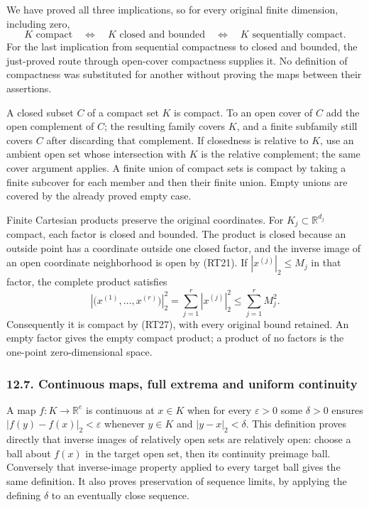 \documentclass[
  11pt,
]{article}
\begin{document}
We have proved all three implications, so for every original finite
dimension, including zero, \[
K\text{ compact}\quad\Longleftrightarrow\quad
K\text{ closed and bounded}
\quad\Longleftrightarrow\quad
K\text{ sequentially compact}.
\tag{RT27}
\] For the last implication from sequential compactness to closed and
bounded, the just-proved route through open-cover compactness supplies
it. No definition of compactness was substituted for another without
proving the maps between their assertions.

A closed subset \(C\) of a compact set \(K\) is compact. To an open
cover of \(C\) add the open complement of \(C\); the resulting family
covers \(K\), and a finite subfamily still covers \(C\) after discarding
that complement. If closedness is relative to \(K\), use an ambient open
set whose intersection with \(K\) is the relative complement; the same
cover argument applies. A finite union of compact sets is compact by
taking a finite subcover for each member and then their finite union.
Empty unions are covered by the already proved empty case.

Finite Cartesian products preserve the original coordinates. For
\(K_j\subset\mathbb R^{d_j}\) compact, each factor is closed and
bounded. The product is closed because an outside point has a coordinate
outside one closed factor, and the inverse image of an open coordinate
neighborhood is open by (RT21). If \(|x^{(j)}|_2\le M_j\) in that
factor, the complete product satisfies \[
\left|\bigl(x^{(1)},\ldots,x^{(r)}\bigr)\right|_2^2
=\sum_{j=1}^r |x^{(j)}|_2^2\le\sum_{j=1}^r M_j^2.
\tag{RT28}
\] Consequently it is compact by (RT27), with every original bound
retained. An empty factor gives the empty compact product; a product of
no factors is the one-point zero-dimensional space.

\subsubsection{12.7. Continuous maps, full extrema and uniform
continuity}\label{continuous-maps-full-extrema-and-uniform-continuity}

A map \(f:K\to\mathbb R^e\) is continuous at \(x\in K\) when for every
\(\varepsilon>0\) some \(\delta>0\) ensures
\(|f(y)-f(x)|_2<\varepsilon\) whenever \(y\in K\) and
\(|y-x|_2<\delta\). This definition proves directly that inverse images
of relatively open sets are relatively open: choose a ball about
\(f(x)\) in the target open set, then its continuity preimage ball.
Conversely that inverse-image property applied to every target ball
gives the same definition. It also proves preservation of sequence
limits, by applying the defining \(\delta\) to an eventually close
sequence.
\end{document}
